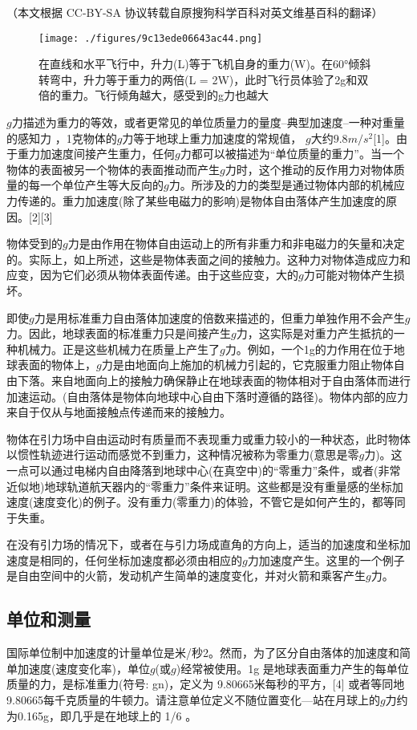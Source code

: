 
（本文根据 CC-BY-SA 协议转载自原搜狗科学百科对英文维基百科的翻译）

\begin{figure}[ht]
\centering
\texttt{[image: ./figures/9c13ede06643ac44.png]}
\caption{在直线和水平飞行中，升力(L)等于飞机自身的重力(W)。在60°倾斜转弯中，升力等于重力的两倍(L = 2W)，此时飞行员体验了2g和双倍的重力。飞行倾角越大，感受到的g力也越大} \label{fig_GLI_4}
\end{figure}

$g$力描述为重力的等效，或者更常见的单位质量力的量度–典型加速度–一种对重量的感知力 ，1克物体的$g$力等于地球上重力加速度的常规值， $g$大约$9.8 m/s^2$[1]。由于重力加速度间接产生重力，任何$g$力都可以被描述为“单位质量的重力”。当一个物体的表面被另一个物体的表面推动而产生$g$力时，这个推动的反作用力对物体质量的每一个单位产生等大反向的$g$力。所涉及的力的类型是通过物体内部的机械应力传递的。重力加速度(除了某些电磁力的影响)是物体自由落体产生加速度的原因。[2][3]

物体受到的$g$力是由作用在物体自由运动上的所有非重力和非电磁力的矢量和决定的。实际上，如上所述，这些是物体表面之间的接触力。这种力对物体造成应力和应变，因为它们必须从物体表面传递。由于这些应变，大的$g$力可能对物体产生损坏。

即使$g$力是用标准重力自由落体加速度的倍数来描述的，但重力单独作用不会产生$g$力。因此，地球表面的标准重力只是间接产生$g$力，这实际是对重力产生抵抗的一种机械力。正是这些机械力在质量上产生了$g$力。例如，一个1g的力作用在位于地球表面的物体上，$g$力是由地面向上施加的机械力引起的，它克服重力阻止物体自由下落。来自地面向上的接触力确保静止在地球表面的物体相对于自由落体而进行加速运动。(自由落体是物体向地球中心自由下落时遵循的路径)。物体内部的应力来自于仅从与地面接触点传递而来的接触力。

物体在引力场中自由运动时有质量而不表现重力或重力较小的一种状态，此时物体以惯性轨迹进行运动而感觉不到重力，这种情况被称为零重力(意思是零$g$力)。这一点可以通过电梯内自由降落到地球中心(在真空中)的“零重力”条件，或者(非常近似地)地球轨道航天器内的“零重力”条件来证明。这些都是没有重量感的坐标加速度(速度变化)的例子。没有重力(零重力)的体验，不管它是如何产生的，都等同于失重。

在没有引力场的情况下，或者在与引力场成直角的方向上，适当的加速度和坐标加速度是相同的，任何坐标加速度都必须由相应的$g$力加速度产生。这里的一个例子是自由空间中的火箭，发动机产生简单的速度变化，并对火箭和乘客产生$g$力。

\subsection{单位和测量}
国际单位制中加速度的计量单位是米/秒2。然而，为了区分自由落体的加速度和简单加速度(速度变化率)，单位$g$(或$g$)经常被使用。1g 是地球表面重力产生的每单位质量的力，是标准重力(符号: gn)，定义为 9.80665米每秒的平方，[4] 或者等同地 9.80665每千克质量的牛顿力。请注意单位定义不随位置变化—站在月球上的$g$力约为0.165g，即几乎是在地球上的 1/6 。

